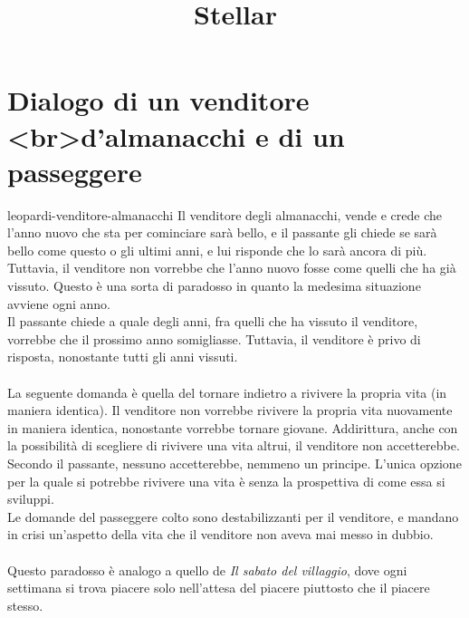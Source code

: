 \documentclass[preview]{standalone}
\begin{document}
\title{Stellar}
\genpage

\section{Dialogo di un venditore <br>d'almanacchi e di un passeggere}


\begin{snippet}{leopardi-venditore-almanacchi}
    Il venditore degli almanacchi, vende e crede che l'anno nuovo che sta per cominciare
    sarà bello, e il passante gli chiede se sarà bello come questo o gli ultimi anni, e
    lui risponde che lo sarà ancora di più. Tuttavia, il venditore non vorrebbe
    che l'anno nuovo fosse come quelli che ha già vissuto.
    Questo è una sorta di paradosso in quanto la medesima situazione avviene
    ogni anno.
    \\
    Il passante chiede a quale degli anni, fra quelli che ha vissuto il venditore, vorrebbe
    che il prossimo anno somigliasse.
    Tuttavia, il venditore è privo di risposta, nonostante tutti gli anni vissuti.
    \\\\
    La seguente domanda è quella del tornare indietro a rivivere la propria vita (in maniera identica).
    Il venditore non vorrebbe rivivere la propria vita nuovamente in maniera identica,
    nonostante vorrebbe tornare giovane.
    Addirittura, anche con la possibilità di scegliere di rivivere una vita altrui, il venditore
    non accetterebbe.
    Secondo il passante, nessuno accetterebbe, nemmeno un principe.
    L'unica opzione per la quale si potrebbe rivivere una vita è senza la prospettiva di come
    essa si sviluppi.
    \\
    Le domande del passeggere colto sono destabilizzanti per il venditore, e mandano in crisi
    un'aspetto della vita che il venditore non aveva mai messo in dubbio.
    \\\\
    Questo paradosso è analogo a quello de \textit{Il sabato del villaggio}, 
    dove ogni settimana si trova piacere solo nell'attesa del piacere piuttosto
    che il piacere stesso.
    
\end{snippet}
\end{document}
